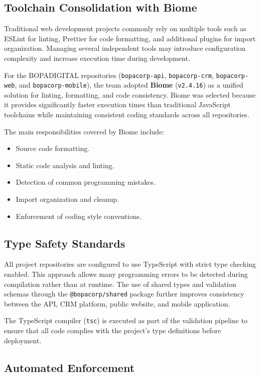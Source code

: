 \documentclass[letterpaper%
, oneside%
, 12pt%
, memoireprojet%
, english%
,creativecommons,hyperref, withAlgo2e %
]{thETS}
\begin{document}
\subsection{Toolchain Consolidation with Biome}

Traditional web development projects commonly rely on multiple tools such as ESLint for linting, Prettier for code formatting, and additional plugins for import organization. Managing several independent tools may introduce configuration complexity and increase execution time during development.

For the BOPADIGITAL repositories (\texttt{bopacorp-api}, \texttt{bopacorp-crm}, \texttt{bopacorp-web}, and \texttt{bopacorp-mobile}), the team adopted \textbf{Biome} (\texttt{v2.4.16}) as a unified solution for linting, formatting, and code consistency. Biome was selected because it provides significantly faster execution times than traditional JavaScript toolchains while maintaining consistent coding standards across all repositories.

The main responsibilities covered by Biome include:

\begin{itemize}
\item Source code formatting.
\item Static code analysis and linting.
\item Detection of common programming mistakes.
\item Import organization and cleanup.
\item Enforcement of coding style conventions.
\end{itemize}

\subsection{Type Safety Standards}

All project repositories are configured to use TypeScript with strict type checking enabled. This approach allows many programming errors to be detected during compilation rather than at runtime. The use of shared types and validation schemas through the \texttt{@bopacorp/shared} package further improves consistency between the API, CRM platform, public website, and mobile application.

The TypeScript compiler (\texttt{tsc}) is executed as part of the validation pipeline to ensure that all code complies with the project's type definitions before deployment.

\subsection{Automated Enforcement}
\end{document}
